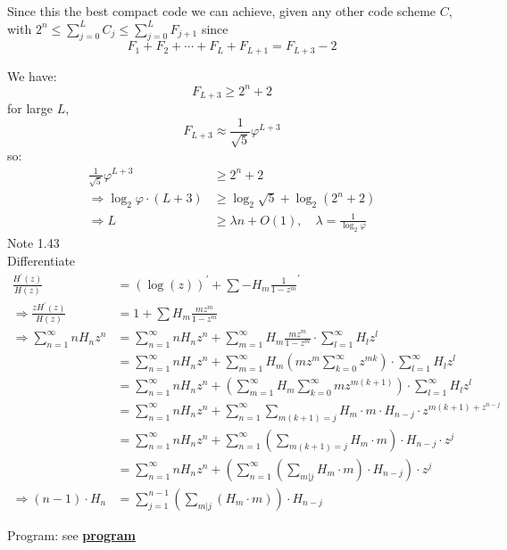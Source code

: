 \documentclass{article}
\newcommand{\myderiv}[1]{#1^\prime}
\newcommand{\mySum}[3]{\ensuremath{\sum_{#1 = #2}^{#3}}}
\begin{document}
Since this the best compact code we can achieve, given any other code scheme $C$, with $2^n \leq \mySum{j}{0}{L} C_j \leq \mySum{j}{0}{L} F_{j+1}$
since 
\[F_1 + F_2 + \cdots + F_{L} + F_{L+1} = F_{L+3} - 2\]

We have:
\[F_{L+3} \geq 2^n + 2\]
for large $L$, \[F_{L+3} \approx \frac{1}{\sqrt{5}}\varphi^{L+3}\]
so:
\begin{align*}
	\frac{1}{\sqrt{5}}\varphi^{L+3} &\geq 2^n + 2 \\
	\Rightarrow \log_2 \varphi \cdot (L + 3) &\geq \log_2 {\sqrt{5}} + \log_2 (2^n + 2) \\
	\Rightarrow L &\geq \lambda n + O(1), \quad \lambda = \frac{1}{\log_2 \varphi}
\end{align*}
Note 1.43\\
Differentiate 
\begin{align*}
	\frac{H^{'}(z)}{H(z)} &= \myderiv{(\log (z))} + \sum \myderiv{-H_m \frac{1}{1-z^m}}\\
	\Rightarrow \frac{zH^\prime(z)}{H(z)} &= 1 + \sum H_m \frac{mz^m}{1 - z^m}\\
	\Rightarrow \sum_{n = 1}^{\infty} nH_n z^n &= \mySum{n}{1}{\infty}  nH_n z^n + \mySum{m}{1}{\infty} H_m \frac{mz^m}{1- z^m} \cdot \sum_{l = 1}^{\infty} H_l z^l \\
	&= \mySum{n}{1}{\infty}  nH_n z^n + \mySum{m}{1}{\infty} H_m (mz^m \mySum{k}{0}{\infty}z^{mk}) \cdot \sum_{l = 1}^{\infty} H_l z^l \\
	&= \mySum{n}{1}{\infty}  nH_n z^n + (\mySum{m}{1}{\infty} H_m \mySum{k}{0}{\infty}mz^{m(k+1)}) \cdot \sum_{l = 1}^{\infty} H_l z^l\\
	&= \mySum{n}{1}{\infty}  nH_n z^n + \mySum{n}{1}{\infty}\sum_{m(k+1) = j} H_m \cdot m \cdot H_{n-j} \cdot z^{m(k+1) + z^{n-j}} \\
	&= \mySum{n}{1}{\infty}  nH_n z^n + \mySum{n}{1}{\infty} (\sum_{m(k+1) = j} H_m \cdot m) \cdot H_{n-j} \cdot z^{j}\\
	&= \mySum{n}{1}{\infty}  nH_n z^n +( \mySum{n}{1}{\infty} (\sum_{m | j} H_m \cdot m) \cdot H_{n-j} ) \cdot z^{j} \\
	\Rightarrow (n-1)\cdot H_n &= \mySum{j}{1}{n-1} (\sum_{m | j} (H_m \cdot m)) \cdot H_{n-j}
\end{align*}

Program:
see \href{https://github.com/BillMark98/combiAna/week1}{\textbf{program}}
\end{document}
